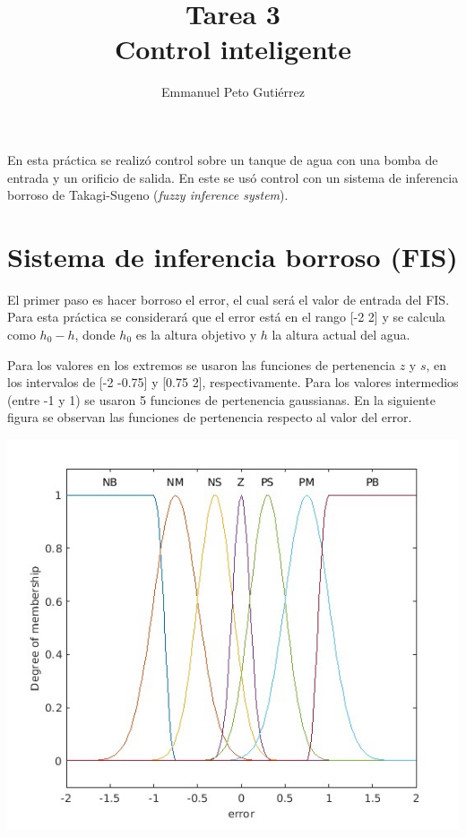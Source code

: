 \documentclass{article}
\title{Tarea 3\\Control inteligente}
\author{Emmanuel Peto Gutiérrez}
\begin{document}
\maketitle

En esta práctica se realizó control sobre un tanque de agua con una bomba de entrada y un orificio de salida. En este se usó control con un sistema de inferencia borroso de Takagi-Sugeno (\textit{fuzzy inference system}).

\section{Sistema de inferencia borroso (FIS)}

El primer paso es hacer borroso el error, el cual será el valor de entrada del FIS. Para esta práctica se considerará que el error está en el rango [-2 2] y se calcula como $h_0 - h$, donde $h_0$ es la altura objetivo y $h$ la altura actual del agua.

Para los valores en los extremos se usaron las funciones de pertenencia $z$ y $s$, en los intervalos de [-2 -0.75] y [0.75 2], respectivamente. Para los valores intermedios (entre -1 y 1) se usaron 5 funciones de pertenencia gaussianas. En la siguiente figura se observan las funciones de pertenencia respecto al valor del error.

\begin{center}
\includegraphics[scale=0.4]{membership}
\end{center}
\end{document}
